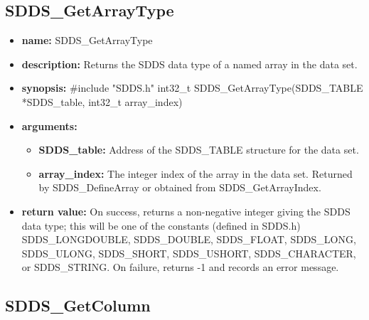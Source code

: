 \documentclass[11pt]{article}
\begin{document}
\subsection{SDDS\_GetArrayType}
\label{SDDS_GetArrayType}

\begin{itemize}
\item {\bf name:}\newline
SDDS\_GetArrayType
\item {\bf description:}\newline
Returns the SDDS data type of a named array in the data set.
\item {\bf synopsis:} \#include "SDDS.h"\newline
int32\_t SDDS\_GetArrayType(SDDS\_TABLE *SDDS\_table, int32\_t array\_index) 
\item {\bf arguments:}
\begin{itemize}
\item {\bf SDDS\_table:} Address of the SDDS\_TABLE structure for the data set.
\item {\bf array\_index:} The integer index of the array in the data set. Returned by SDDS\_DefineArray or obtained from SDDS\_GetArrayIndex.
\end{itemize}
\item {\bf return value:}\newline
On success, returns a non-negative integer giving the SDDS data type; this will be one of the constants (defined in SDDS.h) SDDS\_LONGDOUBLE, SDDS\_DOUBLE, SDDS\_FLOAT, SDDS\_LONG, SDDS\_ULONG, SDDS\_SHORT, SDDS\_USHORT, SDDS\_CHARACTER, or SDDS\_STRING.\newline
\newline
On failure, returns -1 and records an error message. 
\end{itemize}

\subsection{SDDS\_GetColumn}
\label{SDDS_GetColumn}
\end{document}
